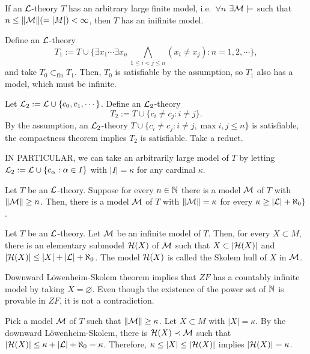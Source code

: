 \documentclass{../../../small}
\begin{document}
\begin{ex*}
If an $\mathcal{L}$-theory $T$ has an arbitrary large finite model, i.e.~$\forall n$ $\exists\mathcal{M}\models$ such that $n\le\|\mathcal{M}\|(=|M|)<\infty$, then $T$ has an inifinite model.
\end{ex*}
\begin{pf}[Proof 1]
Define an $\mathcal{L}$-theory
\[T_1:=T\cup\{\exists x_1\cdots\exists x_n\,\bigwedge_{1\le i<j\le n}(x_i\ne x_j):n=1,2,\cdots\},\]
and take $T_0\subset_{\mathrm{fin}}T_1$.
Then, $T_0$ is satisfiable by the assumption, so $T_1$ also has a model, which must be infinite.
\end{pf}
\begin{pf}[Proof 2]
Let $\mathcal{L}_2:=\mathcal{L}\cup\{c_0,c_1,\cdots\}$.
Define an $\mathcal{L}_2$-theory
\[T_2:=T\cup\{c_i\ne c_j:i\ne j\}.\]
By the assumption, an $\mathcal{L}_2$-theory $T\cup\{c_i\ne c_j:i\ne j,\max{i,j}\le n\}$ is satisfiable, the compactness theorem implies $T_2$ is satisfiable.
Take a reduct.

IN PARTICULAR, we can take an arbitrarily large model of $T$ by letting $\mathcal{L}_2:=\mathcal{L}\cup\{c_\alpha:\alpha\in I\}$ with $|I|=\kappa$ for any cardinal $\kappa$.
\end{pf}

\begin{thm*}
Let $T$ be an $\mathcal{L}$-theory.
Suppose for every $n\in\mathbb{N}$ there is a model $\mathcal{M}$ of $T$ with $\|\mathcal{M}\|\ge n$.
Then, there is a model $\mathcal{M}$ of $T$ with $\|\mathcal{M}\|=\kappa$ for every $\kappa\ge|\mathcal{L}|+\aleph_0\}$.
\end{thm*}
\begin{thm*}
Let $T$ be an $\mathcal{L}$-theory.
Let $\mathcal{M}$ be an infinite model of $T$.
Then, for every $X\subset M$, there is an elementary submodel $\mathcal{H}(X)$ of $\mathcal{M}$ such that $X\subset|\mathcal{H}(X)|$ and $|\mathcal{H}(X)|\le|X|+|\mathcal{L}|+\aleph_0$.
The model $\mathcal{H}(X)$ is called the Skolem hull of $X$ in $\mathcal{M}$.
\end{thm*}

\begin{ex*}
Downward L\"owenheim-Skolem theorem implies that $ZF$ has a countably infinite model by taking $X=\varnothing$.
Even though the existence of the power set of $\mathbb{N}$ is provable in $ZF$, it is not a contradiction.
\end{ex*}

\begin{pf}
Pick a model $\mathcal{M}$ of $T$ such that $\|\mathcal{M}\|\ge\kappa$.
Let $X\subset M$ with $|X|=\kappa$.
By the downward L\"owenheim-Skolem, there is $\mathcal{H}(X)\prec\mathcal{M}$ such that $|\mathcal{H}(X)|\le\kappa+|\mathcal{L}|+\aleph_0=\kappa$.
Therefore, $\kappa\le|X|\le|\mathcal{H}(X)|$ implies $|\mathcal{H}(X)|=\kappa$.
\end{pf}
\end{document}
